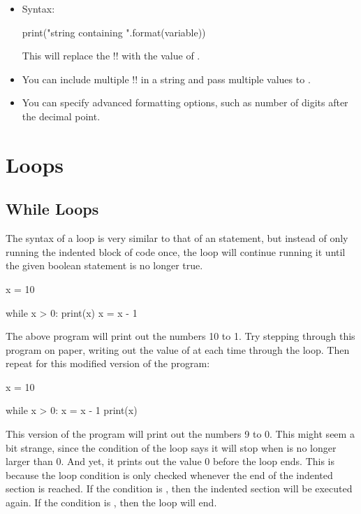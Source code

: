 \documentclass[11pt]{cselabheader}
\begin{document}
{\begin{itemize}
  \item Syntax:
    \begin{python3code}
print("string containing {}".format(variable))
    \end{python3code}

    This will replace the \pythoninline!{}! with the value of
    .

  \item You can include multiple \pythoninline!{}! in a string and pass multiple
    values to .

  \item You can specify advanced formatting options, such as number of digits
    after the decimal point.
\end{itemize}

\pagebreak
\section{Loops}

\subsection{While Loops}
The syntax of a  loop is very similar to that of an
 statement, but instead of only running the indented block of code
once, the  loop will continue running it until the given
boolean statement is no longer true.

\begin{python3code}
x = 10

while x > 0:
    print(x)
    x = x - 1
\end{python3code}

The above program will print out the numbers 10 to 1. Try stepping through this
program on paper, writing out the value of  at each time through
the loop. Then repeat for this modified version of the program:

\begin{python3code}
x = 10

while x > 0:
    x = x - 1
    print(x)
\end{python3code}

This version of the program will print out the numbers 9 to 0. This might seem a
bit strange, since the condition of the loop says it will stop when
 is no longer larger than 0. And yet, it prints out the value 0
before the loop ends. This is because the loop condition is only checked
whenever the end of the indented section is reached. If the condition is
, then the indented section will be executed again. If the
condition is , then the loop will end.

}
\end{document}
